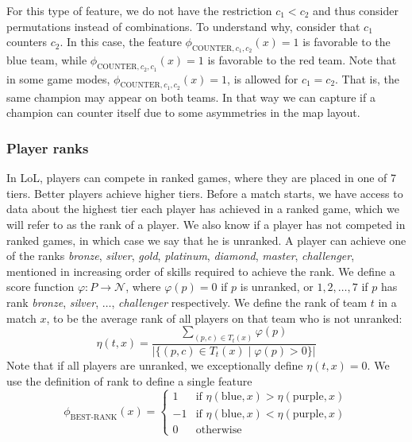 For this type of feature, we do not have the restriction $c_1 < c_2$ and thus consider permutations instead of combinations.
To understand why, consider that $c_1$ counters $c_2$.
In this case, the feature $\phi_{\text{COUNTER},c_1,c_2}(x) = 1$ is favorable to the blue team, while $\phi_{\text{COUNTER},c_2,c_1}(x) = 1$ is favorable to the red team.
Note that in some game modes, $\phi_{\text{COUNTER},c_1,c_2}(x) = 1$, is allowed for $c_1 = c_2$. That is, the same champion may appear on both teams.
In that way we can capture if a champion can counter itself due to some asymmetries in the map layout.

\subsubsection{Player ranks}
In LoL, players can compete in ranked games, where they are placed in one of 7 tiers. Better players achieve higher tiers.
Before a match starts, we have access to data about the highest tier each player has achieved in a ranked game, which we will refer to as the rank of a player. We also know if a player has not competed in ranked games, in which case we say that he is unranked.
A player can achieve one of the ranks \textit{bronze}, \textit{silver}, \textit{gold}, \textit{platinum}, \textit{diamond}, \textit{master}, \textit{challenger}, mentioned in increasing order of skills required to achieve the rank.
We define a score function $\varphi : P \rightarrow \mathcal{N}$, where $\varphi(p) = 0$ if $p$ is unranked, or $1, 2, \dots, 7$ if $p$ has rank \textit{bronze}, \textit{silver}, $\dots$, \textit{challenger} respectively.
We define the rank of team $t$ in a match $x$, to be the average rank of all players on that team who is not unranked:
\begin{equation}\label{eq:eta}
\eta(t, x) = \frac{\sum\limits_{(p,c) \in T_t(x)} \varphi(p)}{|\{(p, c) \in T_t(x) \mid \varphi(p) > 0\}|}
\end{equation}
Note that if all players are unranked, we exceptionally define $\eta(t, x) = 0$. We use the definition of rank to define a single feature
\begin{equation}\label{eq:bestrank}
\phi_\text{BEST-RANK}(x) = 
\begin{cases} 
  1 & \text{if } \eta(\text{blue},x) > \eta(\text{purple},x)\\
  -1 & \text{if } \eta(\text{blue},x) < \eta(\text{purple},x)\\
  0 & \text{otherwise} 
\end{cases}  
\end{equation}

